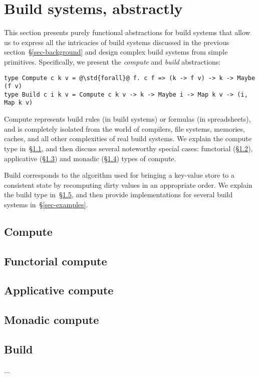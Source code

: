 \section{Build systems, abstractly}\label{sec-abstractions}

This section presents purely functional abstractions for build systems that
allow us to express all the intricacies of build systems discussed in the
previous section~\S\ref{sec-background} and design complex build systems from
simple primitives. Specifically, we present the \emph{compute} and \emph{build}
abstractions:

\begin{verbatim}
type Compute c k v = @\std{forall}@ f. c f => (k -> f v) -> k -> Maybe (f v)
type Build c i k v = Compute c k v -> k -> Maybe i -> Map k v -> (i, Map k v)
\end{verbatim}

\noindent
Compute represents build rules (in build systems) or formulas (in spreadsheets),
and is completely isolated from the world of compilers, file systems, memories,
caches, and all other complexities of real build systems. We explain the compute
type in~\S\ref{sec-compute}, and then discuss several noteworthy special cases:
functorial (\S\ref{sec-compute-functor}), applicative
(\S\ref{sec-compute-applicative}) and monadic (\S\ref{sec-compute-monad}) types
of compute.

Build corresponds to the algorithm used for bringing a key-value store to a
consistent state by recomputing dirty values in an appropriate order. We explain
the build type in~\S\ref{sec-build}, and then provide implementations for several
build systems in~\S\ref{sec-examples}.

\subsection{Compute}\label{sec-compute}


\subsection{Functorial compute}\label{sec-compute-functor}
\subsection{Applicative compute}\label{sec-compute-applicative}
\subsection{Monadic compute}\label{sec-compute-monad}


\subsection{Build}\label{sec-build}

...
